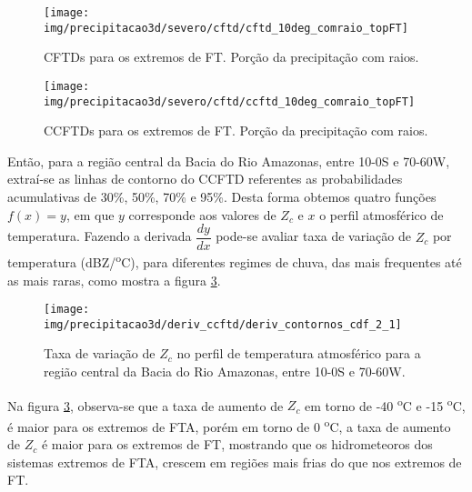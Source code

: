  

\begin{figure}[!ht]
  \centering
  \texttt{[image: img/precipitacao3d/severo/cftd/cftd\_10deg\_comraio\_topFT]}
 \caption{CFTDs para os extremos de FT. Porção da precipitação com raios.}
 \label{cftd_ft_com}
\end{figure} 

\begin{figure}[!ht]
  \centering
  \texttt{[image: img/precipitacao3d/severo/cftd/ccftd\_10deg\_comraio\_topFT]}
  \caption{CCFTDs para os extremos de FT. Porção da precipitação com raios.}
  \label{ccftd_ft_com}   
\end{figure} 

Então, para a região central da Bacia do Rio Amazonas, entre 10-0S e 70-60W, extraí-se as linhas de contorno do CCFTD referentes as probabilidades acumulativas de 30\%, 50\%, 70\% e 95\%. Desta forma obtemos quatro funções $f(x)=y$,  em que $y$ corresponde aos valores de $Z_c$ e $x$ o perfil atmosférico de temperatura. Fazendo a derivada $\dfrac{dy}{dx}$ pode-se avaliar taxa de variação de $Z_c$ por temperatura (dBZ/\textsuperscript{o}C), para diferentes regimes de chuva, das mais frequentes até as mais raras, como mostra a figura \ref{deriv_amazonas}.

\begin{figure}[!ht]
  \centering
  \texttt{[image: img/precipitacao3d/deriv\_ccftd/deriv\_contornos\_cdf\_2\_1]}
  \caption{Taxa de variação de $Z_c$ no perfil de temperatura atmosférico para a região central da Bacia do Rio Amazonas, entre 10-0S e 70-60W.}
  \label{deriv_amazonas}  
\end{figure} 


Na figura \ref{deriv_amazonas}, observa-se que a taxa de aumento de $Z_c$ em torno de -40 \textsuperscript{o}C e -15 \textsuperscript{o}C, é maior para os extremos de FTA, porém em torno de 0 \textsuperscript{o}C, a taxa de aumento de $Z_c$ é maior para os extremos de FT, mostrando que os hidrometeoros dos sistemas extremos de FTA, crescem em regiões mais frias do que nos extremos de FT.


